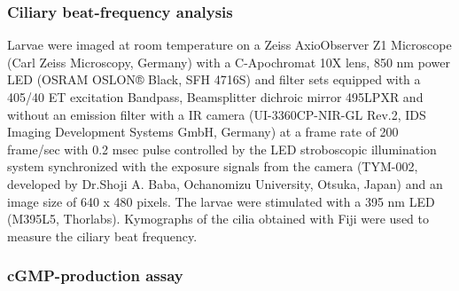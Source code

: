 \documentclass[
  11pt,
  letterpaper,
  DIV=11,
  numbers=noendperiod]{scrartcl}
\begin{document}
\subsubsection{Ciliary beat-frequency
analysis}\label{ciliary-beat-frequency-analysis}

Larvae were imaged at room temperature on a Zeiss AxioObserver Z1
Microscope (Carl Zeiss Microscopy, Germany) with a C-Apochromat 10X
lens, 850 nm power LED (OSRAM OSLON® Black, SFH 4716S) and filter sets
equipped with a 405/40 ET excitation Bandpass, Beamsplitter dichroic
mirror 495LPXR and without an emission filter with a IR camera
(UI-3360CP-NIR-GL Rev.2, IDS Imaging Development Systems GmbH, Germany)
at a frame rate of 200 frame/sec with 0.2 msec pulse controlled by the
LED stroboscopic illumination system synchronized with the exposure
signals from the camera (TYM-002, developed by Dr.Shoji A. Baba,
Ochanomizu University, Otsuka, Japan) and an image size of 640 x 480
pixels. The larvae were stimulated with a 395 nm LED (M395L5, Thorlabs).
Kymographs of the cilia obtained with Fiji were used to measure the
ciliary beat frequency.

\subsubsection{cGMP-production assay}\label{cgmp-production-assay}
\end{document}
